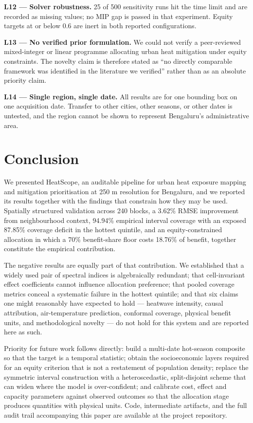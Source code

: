 \textbf{L12 --- Solver robustness.} 25 of 500 sensitivity runs hit the time limit and are recorded as
missing values; no MIP gap is passed in that experiment. Equity targets at or below 0.6 are inert in
both reported configurations.

\textbf{L13 --- No verified prior formulation.} We could not verify a peer-reviewed mixed-integer or linear
programme allocating urban heat mitigation under equity constraints. The novelty claim is therefore
stated as ``no directly comparable framework was identified in the literature we verified'' rather than
as an absolute priority claim.

\textbf{L14 --- Single region, single date.} All results are for one bounding box on one acquisition date.
Transfer to other cities, other seasons, or other dates is untested, and the region cannot be shown to
represent Bengaluru's administrative area.

\section{Conclusion}\label{ix.-conclusion}

We presented HeatScope, an auditable pipeline for urban heat exposure mapping and mitigation
prioritisation at 250 m resolution for Bengaluru, and we reported its results together with the
findings that constrain how they may be used. Spatially structured validation across 240 blocks, a
3.62\% RMSE improvement from neighbourhood context, 94.94\% empirical interval coverage with an
exposed 87.85\% coverage deficit in the hottest quintile, and an equity-constrained allocation in which
a 70\% benefit-share floor costs 18.76\% of benefit, together constitute the empirical contribution.

The negative results are equally part of that contribution. We established that a widely used pair of
spectral indices is algebraically redundant; that cell-invariant effect coefficients cannot influence
allocation preference; that pooled coverage metrics conceal a systematic failure in the hottest
quintile; and that six claims one might reasonably have expected to hold --- heatwave intensity,
causal attribution, air-temperature prediction, conformal coverage, physical benefit units, and
methodological novelty --- do not hold for this system and are reported here as such.

Priority for future work follows directly: build a multi-date hot-season composite so that the target
is a temporal statistic; obtain the socioeconomic layers required for an equity criterion that is not
a restatement of population density; replace the symmetric interval construction with a
heteroscedastic, split-disjoint scheme that can widen where the model is over-confident; and calibrate
cost, effect and capacity parameters against observed outcomes so that the allocation stage produces
quantities with physical units. Code, intermediate artifacts, and the full audit trail accompanying
this paper are available at the project repository.

